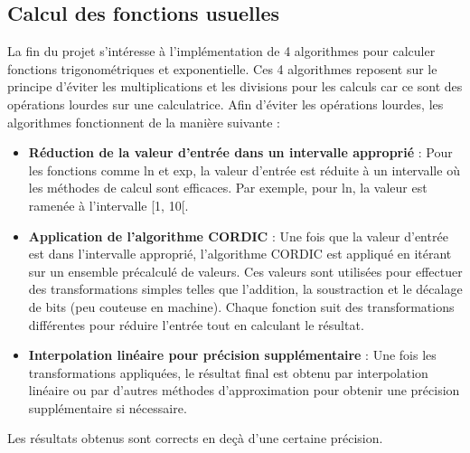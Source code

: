 \documentclass[svgnames]{report}
\begin{document}
\subsection{Calcul des fonctions usuelles}
La fin du projet s'intéresse à l'implémentation de 4 algorithmes pour calculer fonctions trigonométriques et exponentielle. \newline 
Ces 4 algorithmes reposent sur le principe d'éviter les multiplications et les divisions pour les calculs car ce sont des opérations lourdes sur une calculatrice. Afin d'éviter les opérations lourdes, les algorithmes fonctionnent de la manière suivante :
\begin{itemize}
    \item \textbf{Réduction de la valeur d'entrée dans un intervalle approprié} : Pour les fonctions comme ln et exp, la valeur d'entrée est réduite à un intervalle où les méthodes de calcul sont efficaces. Par exemple, pour ln, la valeur est ramenée à l'intervalle [1, 10[.
    \item \textbf{Application de l'algorithme CORDIC} : Une fois que la valeur d'entrée est dans l'intervalle approprié, l'algorithme CORDIC est appliqué en itérant sur un ensemble précalculé de valeurs. Ces valeurs sont utilisées pour effectuer des transformations simples telles que l'addition, la soustraction et le décalage de bits (peu couteuse en machine).
    Chaque fonction suit des transformations différentes pour réduire l'entrée tout en calculant le résultat.
    \item \textbf{Interpolation linéaire pour précision supplémentaire} : Une fois les transformations appliquées, le résultat final est obtenu par interpolation linéaire ou par d'autres méthodes d'approximation pour obtenir une précision supplémentaire si nécessaire.
\end{itemize}

Les résultats obtenus sont corrects en deçà d'une certaine précision.
\end{document}
